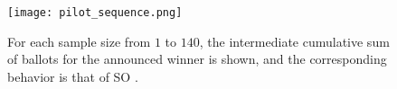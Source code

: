 \begin{figure}
\texttt{[image: pilot\_sequence.png]}
\caption{For each sample size from $1$ to $140$, the intermediate cumulative sum of ballots for the announced winner is shown, and the corresponding behavior is that of SO \BRAVO.}
\label{fig:pilot_sequence}
\end{figure}




